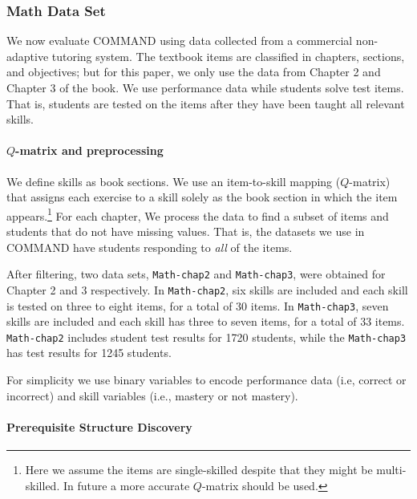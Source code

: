 \documentclass{edm_template}
\begin{document}
	\subsubsection{Math Data Set}
	We now evaluate COMMAND using data collected from a commercial non-adaptive tutoring system.
	The textbook items are classified in chapters, sections, and objectives; but for this paper, we only use the data from Chapter 2 and Chapter 3 of the book.
	We use performance data while students solve test items. That is, students are tested on the items after they have been taught all relevant skills.
	
	\paragraph{$Q$-matrix and preprocessing}
	\label{sec:preprocessing}
	We define skills as book sections.
	We use an item-to-skill mapping ($Q$-matrix) that assigns each exercise to a skill solely as the book section in which the item appears.\footnote{Here we assume the items are single-skilled despite that they might be multi-skilled. In future a more accurate $Q$-matrix should be used.}
	For each chapter, We process the data to find a subset of items and students that do not have missing values.
	That is, the datasets we use in COMMAND have students responding to \textit{all} of the  items.
	
	After filtering, two data sets, \texttt{Math-chap2} and \texttt{Math-chap3}, were obtained for Chapter 2 and 3 respectively. 
	In \texttt{Math-chap2}, six skills are included and each skill is tested on three to eight items, for a total of 30  items.
	In \texttt{Math-chap3}, seven skills are included and each skill has three to seven items, for a total of 33 items.
	\texttt{Math-chap2} includes student test results for 1720 students, 
	while the \texttt{Math-chap3} has test results for 1245 students.
	
	For simplicity we use binary variables to encode  performance data (i.e, correct or incorrect) and skill variables  (i.e., mastery or not mastery).
	
	\paragraph{Prerequisite Structure Discovery}
	\label{sec:prerequisite_results}
	
\end{document}
